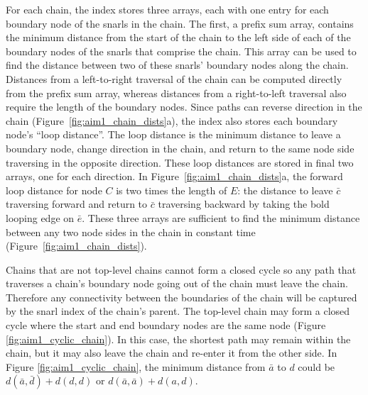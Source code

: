\documentclass[11pt]{ucscthesis}
\begin{document}
For each chain, the index stores three arrays, each with one entry for each boundary node of the snarls in the chain.
The first, a prefix sum array, contains the minimum distance from the start of the chain to the left side of each of the boundary nodes of the snarls that comprise the chain.
This array can be used to find the distance between two of these snarls’ boundary nodes along the chain. Distances from a left-to-right traversal of the chain can be computed directly from the prefix sum array, whereas distances from a right-to-left traversal also require the length of the boundary nodes.
Since paths can reverse direction in the chain (Figure~\ref{fig:aim1_chain_dists}a), the index also stores each boundary node's ``loop distance''.
The loop distance is the minimum distance to leave a boundary node, change direction in the chain, and return to the same node side traversing in the opposite direction.
These loop distances are stored in final two arrays, one for each direction.
In Figure~\ref{fig:aim1_chain_dists}a, the forward loop distance for node $C$ is two times the length of $E$: the distance to leave $\bar{c}$ traversing forward and return to $\bar{c}$ traversing backward by taking the bold looping edge on $\bar{e}$.
These three arrays are sufficient to find the minimum distance between any two node sides in the chain in constant time (Figure~\ref{fig:aim1_chain_dists}).


Chains that are not top-level chains cannot form a closed cycle so any path that traverses a chain's boundary node going out of the chain must leave the chain.
Therefore any connectivity between the boundaries of the chain will be captured by the snarl index of the chain's parent.
The top-level chain may form a closed cycle where the start and end boundary nodes are the same node (Figure \ref{fig:aim1_cyclic_chain}).
In this case, the shortest path may remain within the chain, but it may also leave the chain and re-enter it from the other side.
In Figure \ref{fig:aim1_cyclic_chain}, the minimum distance from $\bar{a}$ to $d$ could be $d(\bar{a}, \bar{d}) + d(d, d)$ or $d(\bar{a}, \bar{a}) + d(a, d)$.
\end{document}
